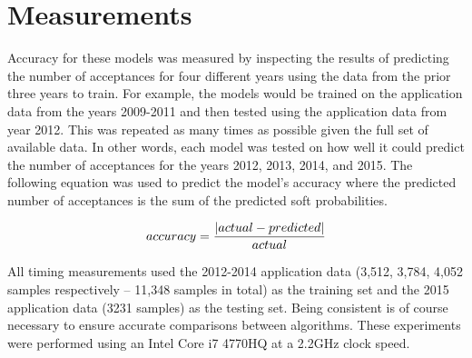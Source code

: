 \section{Measurements}
Accuracy for these models was measured by inspecting the results of predicting the number of acceptances for four different years using the data from the prior three years to train. For example, the models would be trained on the application data from the years 2009-2011 and then tested using the application data from year 2012. This was repeated as many times as possible given the full set of available data. In other words, each model was tested on how well it could predict the number of acceptances for the years 2012, 2013, 2014, and 2015. The following equation was used to predict the model's accuracy where the predicted number of acceptances is the sum of the predicted soft probabilities.

$$accuracy = \frac{\lvert actual-predicted \rvert}{actual}$$

All timing measurements used the 2012-2014 application data (3,512, 3,784, 4,052 samples respectively -- 11,348 samples in total) as the training set and the 2015 application data (3231 samples) as the testing set. Being consistent is of course necessary to ensure accurate comparisons between algorithms. These experiments were performed using an Intel Core i7 4770HQ at a 2.2GHz clock speed.